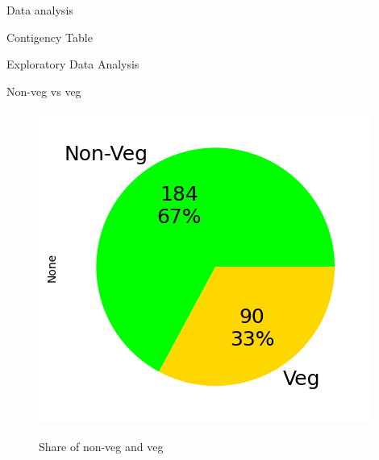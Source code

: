 \documentclass{beamer}
\begin{document}
\begin{frame}{Data analysis}
    \begin{block}{Contigency Table}
   
    \begin{table}[H]
\centering
\caption{Contingency table }
\label{tab:contingency}
\end{table}
    \end{block}
\end{frame}
\begin{frame}{Exploratory Data Analysis}
\begin{block}{Non-veg vs veg}
\begin{figure}
      \centering
    \caption{Share of non-veg and veg}
    \includegraphics[scale = 0.55]{pie_veg_non-veg.png}  
    \label{pie_veg_non_veg}
\end{figure}
\end{block}
\end{frame}
\end{document}
